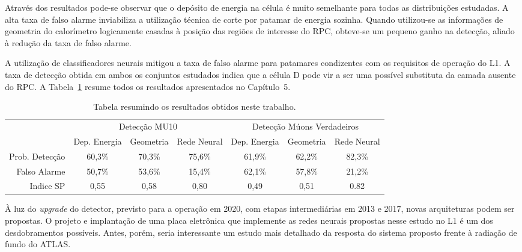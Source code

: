 Através dos resultados pode-se observar que o depósito de energia na célula é
muito semelhante para todas as distribuições estudadas. A alta taxa de falso
alarme inviabiliza a utilização técnica de corte por patamar de energia sozinha.
Quando utilizou-se as informações de geometria do calorímetro logicamente
casadas à posição das regiões de interesse do RPC, obteve-se um pequeno ganho na
detecção, aliado à redução da taxa de falso alarme.

A utilização de classificadores neurais mitigou a taxa de falso alarme para
patamares condizentes com os requisitos de operação do L1. A taxa de detecção
obtida em ambos os conjuntos estudados indica que a célula D pode vir a ser uma
possível substituta da camada ausente do RPC. A Tabela~\ref{summary}
resume todos os resultados apresentados no Capítulo~5.

\begin{table}[hptp!]\footnotesize
  \centering
  \tabcolsep=0.08cm
  \begin{tabular}{ r c c c c c c }
       \multicolumn{1}{c}{} & \multicolumn{3}{c}{Detecção MU10}& \multicolumn{3}{c}{Detecção Múons Verdadeiros} \\
        \cmidrule(r){2-4}
        \cmidrule(r){5-7}
      & Dep. Energia & Geometria & Rede Neural & Dep. Energia & Geometria & Rede Neural \\
      \midrule
      Prob. Detecção & 60,3\% & 70,3\% & 75,6\% & 61,9\%  & 62,2\% & 82,3\% \\[1.5ex]
      Falso Alarme   & 50,7\% & 53,6\% & 15,4\% & 62,1\%  & 57,8\% & 21,2\% \\[1.5ex]
      Indice SP      & 0,55   & 0,58   & 0,80 & 0,49    & 0,51   & 0.82   \\
      \bottomrule
  \end{tabular}
  \caption{Tabela resumindo os resultados obtidos neste trabalho.}
  \label{summary}
\end{table}



À luz do \emph{upgrade} do detector, previsto para a operação em 2020, com
etapas intermediárias em 2013 e 2017, novas arquiteturas podem ser propostas. O
projeto e implantação de uma placa eletrônica que implemente as redes neurais
propostas nesse estudo no L1 é um dos desdobramentos possíveis. Antes, porém,
seria interessante um estudo mais detalhado da resposta do sistema proposto
frente à radiação de fundo do ATLAS.
